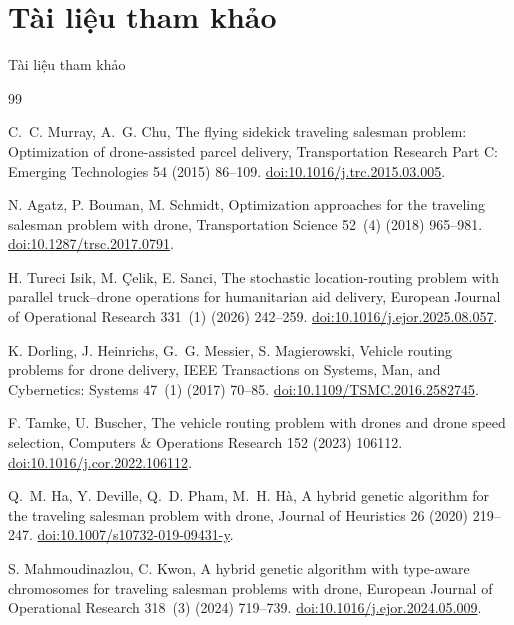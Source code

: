 \documentclass[aspectratio=169,10pt,t,xcolor={table}]{beamer}
\begin{document}
\section{Tài liệu tham khảo}
\begin{frame}[allowframebreaks]{Tài liệu tham khảo}
\scriptsize
\begin{thebibliography}{99}
\setlength{\itemsep}{1.5pt}

C.~C. Murray, A.~G. Chu,
The flying sidekick traveling salesman problem: Optimization of drone-assisted parcel delivery,
Transportation Research Part C: Emerging Technologies 54 (2015) 86--109.
\href{https://doi.org/10.1016/j.trc.2015.03.005}{doi:10.1016/j.trc.2015.03.005}.

N. Agatz, P. Bouman, M. Schmidt,
Optimization approaches for the traveling salesman problem with drone,
Transportation Science 52~(4) (2018) 965--981.
\href{https://doi.org/10.1287/trsc.2017.0791}{doi:10.1287/trsc.2017.0791}.

H. Tureci Isik, M. Çelik, E. Sanci,
The stochastic location-routing problem with parallel truck--drone operations for humanitarian aid delivery,
European Journal of Operational Research 331~(1) (2026) 242--259.
\href{https://doi.org/10.1016/j.ejor.2025.08.057}{doi:10.1016/j.ejor.2025.08.057}.

K. Dorling, J. Heinrichs, G.~G. Messier, S. Magierowski,
Vehicle routing problems for drone delivery,
IEEE Transactions on Systems, Man, and Cybernetics: Systems 47~(1) (2017) 70--85.
\href{https://doi.org/10.1109/TSMC.2016.2582745}{doi:10.1109/TSMC.2016.2582745}.

F. Tamke, U. Buscher,
The vehicle routing problem with drones and drone speed selection,
Computers \& Operations Research 152 (2023) 106112.
\href{https://doi.org/10.1016/j.cor.2022.106112}{doi:10.1016/j.cor.2022.106112}.

Q.~M. Ha, Y. Deville, Q.~D. Pham, M.~H. Hà,
A hybrid genetic algorithm for the traveling salesman problem with drone,
Journal of Heuristics 26 (2020) 219--247.
\href{https://doi.org/10.1007/s10732-019-09431-y}{doi:10.1007/s10732-019-09431-y}.

S. Mahmoudinazlou, C. Kwon,
A hybrid genetic algorithm with type-aware chromosomes for traveling salesman problems with drone,
European Journal of Operational Research 318~(3) (2024) 719--739.
\href{https://doi.org/10.1016/j.ejor.2024.05.009}{doi:10.1016/j.ejor.2024.05.009}.


\end{thebibliography}
\end{frame}
\end{document}
